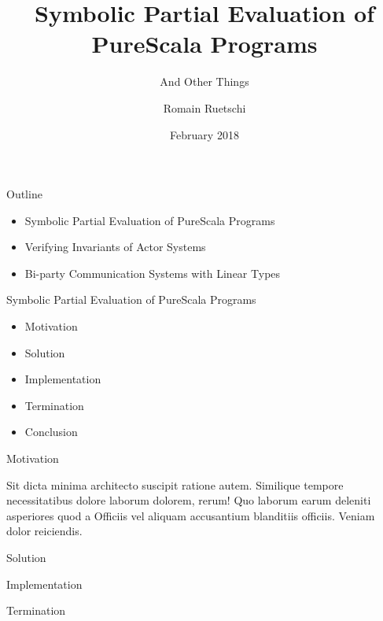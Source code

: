 \documentclass[ignorenonframetext,]{beamer}
\institute{Laboratory for Automated Reasoning and Analysis, EPFL}
\title{Symbolic Partial Evaluation of PureScala Programs}
\subtitle{And Other Things}
\author{Romain Ruetschi}
\date{February 2018}
\providecommand{\tightlist}{%
  \setlength{\itemsep}{0pt}\setlength{\parskip}{0pt}}
\begin{document}
\frame{\titlepage}

\begin{frame}{%
\protect\hypertarget{outline}{%
Outline}}

\begin{itemize}
\tightlist
\item
  Symbolic Partial Evaluation of PureScala Programs
\item
  Verifying Invariants of Actor Systems
\item
  Bi-party Communication Systems with Linear Types
\end{itemize}

\end{frame}

\begin{frame}{%
\protect\hypertarget{symbolic-partial-evaluation-of-purescala-programs}{%
Symbolic Partial Evaluation of PureScala Programs}}

\begin{itemize}
\tightlist
\item
  Motivation
\item
  Solution
\item
  Implementation
\item
  Termination
\item
  Conclusion
\end{itemize}

\end{frame}

\begin{frame}{%
\protect\hypertarget{motivation}{%
Motivation}}

Sit dicta minima architecto suscipit ratione autem. Similique tempore
necessitatibus dolore laborum dolorem, rerum! Quo laborum earum deleniti
asperiores quod a Officiis vel aliquam accusantium blanditiis officiis.
Veniam dolor reiciendis.

\end{frame}

\begin{frame}{%
\protect\hypertarget{solution}{%
Solution}}

\end{frame}

\begin{frame}{%
\protect\hypertarget{implementation}{%
Implementation}}

\end{frame}

\begin{frame}{%
\protect\hypertarget{termination}{%
Termination}}

\end{frame}
\end{document}
